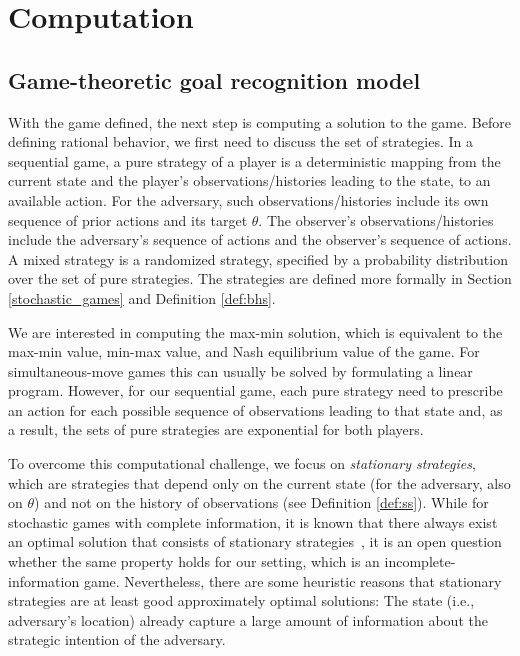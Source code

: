 %
%
\chapter{Computation}

\section{Game-theoretic goal recognition model}

With the game defined, the next step is computing a solution to the game. 
Before defining rational behavior, we first need to discuss the set of strategies. In a sequential game, 
a pure strategy of a player is a deterministic mapping from the
current state and the player's observations/histories leading to the state, to an available action. For the adversary, such observations/histories include its own sequence 
of prior actions and its target $\theta$. 
The observer's observations/histories include 
the adversary's sequence of actions and the observer's sequence of actions.
A mixed strategy is a randomized strategy, specified by a probability distribution over the set of pure strategies.
The strategies are defined more formally in Section \ref{stochastic_games} and Definition \ref{def:bhs}.   

We are interested in computing the max-min solution, 
which is equivalent to the max-min value, min-max value, and Nash equilibrium value  of the game. 
For simultaneous-move games this can usually be solved by formulating a linear program. 
However, for our sequential game, each pure strategy need to prescribe an action for each possible sequence of observations leading to that state and, as a result, the sets of pure strategies are exponential for both players. 

To overcome this computational challenge, we focus on \emph{stationary strategies}, 
which are strategies that depend only on the current 
state (for the adversary, also on $\theta$) and not on the history of observations (see Definition \ref{def:ss}).
While for stochastic games with complete information, it is known that there always exist an optimal solution that consists of stationary strategies~\cite{fudenberg1991game},
 it is an open question whether the same property holds for our setting, which is an incomplete-information game.
Nevertheless, there are some heuristic reasons
that stationary strategies are at least good approximately optimal solutions: The state (i.e., adversary's location) already capture a large amount of information about the strategic intention of the adversary.

